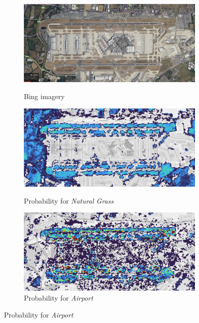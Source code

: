         \begin{figure}[H]
        \centering
        \begin{subfigure}[b]{0.6\textwidth}
            \centering
            \caption{Bing imagery}
            \includegraphics[width=\textwidth]{figs_06/airport_bing.png}
            \label{fig:airport_bing}
        \end{subfigure}
        \begin{subfigure}[b]{0.6\textwidth}
            \centering
            \caption{Probability for \textit{Natural Grass}}
            \includegraphics[width=\textwidth]{figs_06/airport_natural_grass.png}
            \label{fig:airport_natural_gras}
        \end{subfigure}
        \begin{subfigure}[b]{0.6\textwidth}
            \centering
            \caption{Probability for \textit{Airport}}
            \includegraphics[width=\textwidth]{figs_06/airport_airport.png}

\end{subfigure}
\end{figure}
